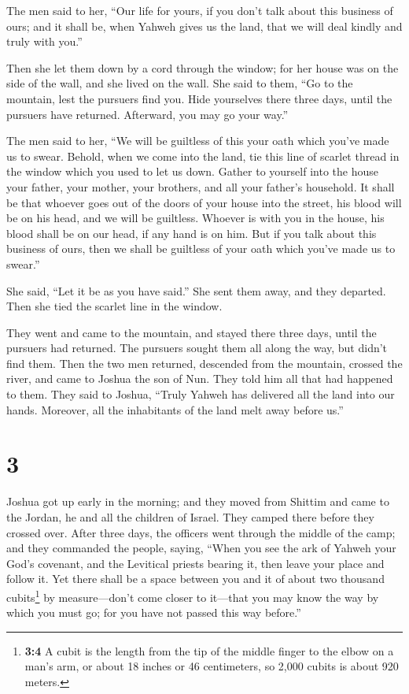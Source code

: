  The men said to her, ``Our life for yours, if you don't
talk about this business of ours; and it shall be, when Yahweh gives us
the land, that we will deal kindly and truly with you.''

 Then she let them down by a cord through the window; for
her house was on the side of the wall, and she lived on the wall.
 She said to them, ``Go to the mountain, lest the
pursuers find you. Hide yourselves there three days, until the pursuers
have returned. Afterward, you may go your way.''

 The men said to her, ``We will be guiltless of this your
oath which you've made us to swear.  Behold, when we come
into the land, tie this line of scarlet thread in the window which you
used to let us down. Gather to yourself into the house your father, your
mother, your brothers, and all your father's household. 
It shall be that whoever goes out of the doors of your house into the
street, his blood will be on his head, and we will be guiltless. Whoever
is with you in the house, his blood shall be on our head, if any hand is
on him.  But if you talk about this business of ours,
then we shall be guiltless of your oath which you've made us to swear.''

 She said, ``Let it be as you have said.'' She sent them
away, and they departed. Then she tied the scarlet line in the window.

 They went and came to the mountain, and stayed there
three days, until the pursuers had returned. The pursuers sought them
all along the way, but didn't find them.  Then the two
men returned, descended from the mountain, crossed the river, and came
to Joshua the son of Nun. They told him all that had happened to them.
 They said to Joshua, ``Truly Yahweh has delivered all
the land into our hands. Moreover, all the inhabitants of the land melt
away before us.''

\hypertarget{section-2}{%
\section{3}\label{section-2}}

 Joshua got up early in the morning; and they moved from
Shittim and came to the Jordan, he and all the children of Israel. They
camped there before they crossed over.  After three days,
the officers went through the middle of the camp;  and
they commanded the people, saying, ``When you see the ark of Yahweh your
God's covenant, and the Levitical priests bearing it, then leave your
place and follow it.  Yet there shall be a space between
you and it of about two thousand cubits\footnote{\textbf{3:4} A cubit is
  the length from the tip of the middle finger to the elbow on a man's
  arm, or about 18 inches or 46 centimeters, so 2,000 cubits is about
  920 meters.} by measure---don't come closer to it---that you may know
the way by which you must go; for you have not passed this way before.''

